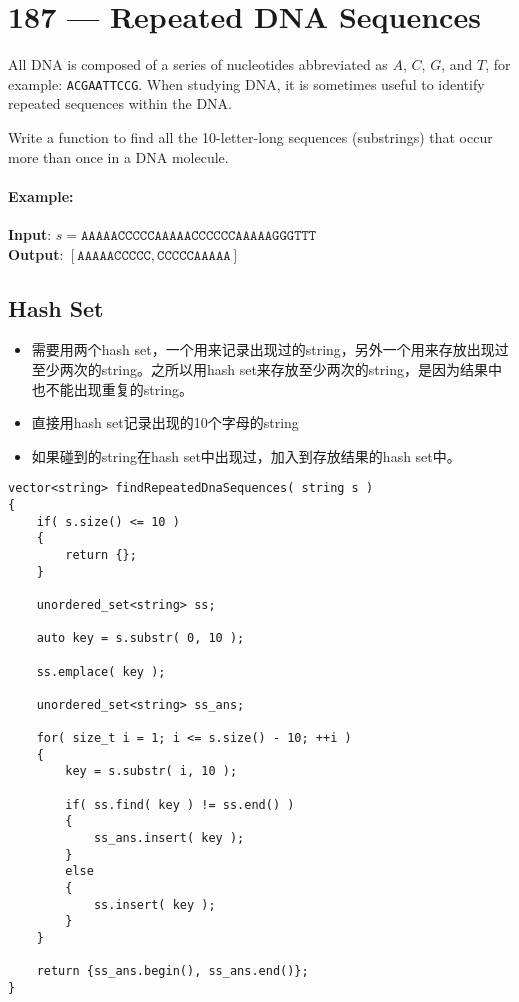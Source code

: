 \section{187 --- Repeated DNA Sequences}
All DNA is composed of a series of nucleotides abbreviated as $A$, $C$, $G$, and $T$, for example: \texttt{ACGAATTCCG}. When studying DNA, it is sometimes useful to identify repeated sequences within the DNA.
\par
Write a function to find all the 10-letter-long sequences (substrings) that occur more than once in a DNA molecule.
\paragraph{Example:}
\begin{flushleft}
\textbf{Input}: $s = \texttt{AAAAACCCCCAAAAACCCCCCAAAAAGGGTTT}$
\\
\textbf{Output}: $[\texttt{AAAAACCCCC}, \texttt{CCCCCAAAAA}]$
\end{flushleft}
\subsection{Hash Set}
\begin{CJK*}{UTF8}{gbsn}
\begin{itemize}
\item 需要用两个hash set，一个用来记录出现过的string，另外一个用来存放出现过至少两次的string。之所以用hash set来存放至少两次的string，是因为结果中也不能出现重复的string。
\item 直接用hash set记录出现的10个字母的string
\item 如果碰到的string在hash set中出现过，加入到存放结果的hash set中。
\end{itemize}
\end{CJK*}
\setcounter{lstlisting}{0}
\begin{lstlisting}[style=customc, caption={Hash Sets}]
vector<string> findRepeatedDnaSequences( string s )
{
    if( s.size() <= 10 )
    {
        return {};
    }

    unordered_set<string> ss;

    auto key = s.substr( 0, 10 );

    ss.emplace( key );

    unordered_set<string> ss_ans;

    for( size_t i = 1; i <= s.size() - 10; ++i )
    {
        key = s.substr( i, 10 );

        if( ss.find( key ) != ss.end() )
        {
            ss_ans.insert( key );
        }
        else
        {
            ss.insert( key );
        }
    }

    return {ss_ans.begin(), ss_ans.end()};
}
\end{lstlisting}